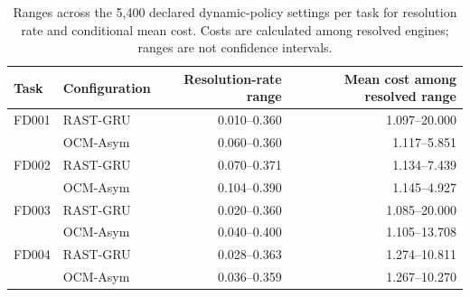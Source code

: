 \begin{table}[H]
\centering
\scriptsize
\setlength{\tabcolsep}{4pt}
\caption{Ranges across the 5,400 declared dynamic-policy settings per task for resolution rate and conditional mean cost. Costs are calculated among resolved engines; ranges are not confidence intervals.}
\label{tab:dynamic-policy-resolution}
\begin{tabular}{@{}llrr@{}}
\toprule
Task & Configuration & Resolution-rate range & Mean cost among resolved range \\
\midrule
FD001 & RAST-GRU & 0.010--0.360 & 1.097--20.000 \\
       & OCM-Asym & 0.060--0.360 & 1.117--5.851 \\
FD002 & RAST-GRU & 0.070--0.371 & 1.134--7.439 \\
       & OCM-Asym & 0.104--0.390 & 1.145--4.927 \\
FD003 & RAST-GRU & 0.020--0.360 & 1.085--20.000 \\
       & OCM-Asym & 0.040--0.400 & 1.105--13.708 \\
FD004 & RAST-GRU & 0.028--0.363 & 1.274--10.811 \\
       & OCM-Asym & 0.036--0.359 & 1.267--10.270 \\
\bottomrule
\end{tabular}
\end{table}
